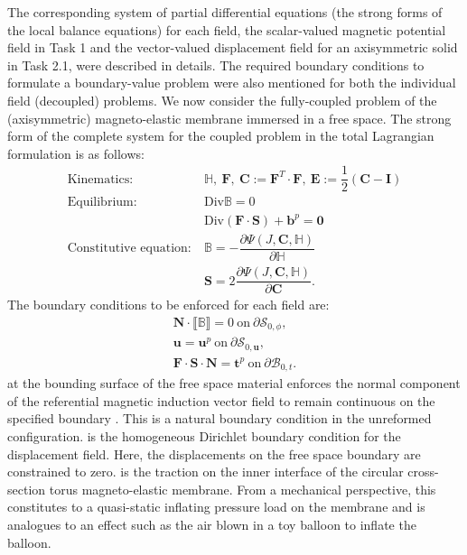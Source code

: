 \documentclass[11pt,a4paper,final]{article}
\begin{document}
The corresponding system of partial differential equations (the strong forms of the local balance equations) for each field, the scalar-valued magnetic potential field in Task 1 and the vector-valued displacement field for an axisymmetric solid in Task 2.1, were described in details. The required boundary conditions to formulate a boundary-value problem were also mentioned for both the individual field (decoupled) problems. We now consider the fully-coupled problem of the (axisymmetric) magneto-elastic membrane immersed in a free space. The strong form of the complete system for the coupled problem in the total Lagrangian formulation is as follows:
\begin{align}
\text{Kinematics}:& \ \mathbb{H}, \ \mathbf{F}, \ \mathbf{C} := \mathbf{F}^T \cdot \mathbf{F}, \ \mathbf{E} := \dfrac{1}{2} (\mathbf{C} - \mathbf{I}) \label{eq:3.22.1}\\
\text{Equilibrium}:& \ \text{Div} \mathbb{B} = 0 \label{eq:3.22.2}\\
& \ \text{Div}(\mathbf{F} \cdot \mathbf{S}) + \mathbf{b}^p = \mathbf{0} \label{eq:3.22.3}\\
\text{Constitutive equation}:& \ \mathbb{B} = -\dfrac{\partial \Psi (J, \mathbf{C}, \mathbb{H})}{\partial \mathbb{H}} \label{eq:3.22.4}\\
& \ \mathbf{S} = 2\dfrac{\partial \Psi (J, \mathbf{C}, \mathbb{H})}{\partial \mathbf{C}}.
\label{eq:3.22.5}
\end{align}
The boundary conditions to be enforced for each field are: 
\begin{align}
\mathbf{N} \cdot \llbracket \mathbb{B} \rrbracket = 0 \ \text{on} \ \partial \mathcal{S}_{0, \phi}, \label{eq:3.23.1}\\
\mathbf{u} = \mathbf{u}^p \ \text{on} \ \partial \mathcal{S}_{0, \mathbf{u}}, \label{eq:3.23.2}\\
\mathbf{F} \cdot \mathbf{S} \cdot \mathbf{N} = \mathbf{t}^p \ \text{on} \ \partial \mathcal{B}_{0, t}.
\label{eq:3.23.3}
\end{align}
 at the bounding surface of the free space material enforces the normal component of the referential magnetic induction vector field to remain continuous on the specified boundary \cite{Pelteret2016}. This is a natural boundary condition in the unreformed configuration.  is the homogeneous Dirichlet boundary condition for the displacement field. Here, the displacements on the free space boundary are constrained to zero.  is the traction on the inner interface of the circular cross-section torus magneto-elastic membrane. From a mechanical perspective, this constitutes to a quasi-static inflating pressure load on the membrane and is analogues to an effect such as the air blown in a toy balloon to inflate the balloon. \newline \par 
\end{document}
